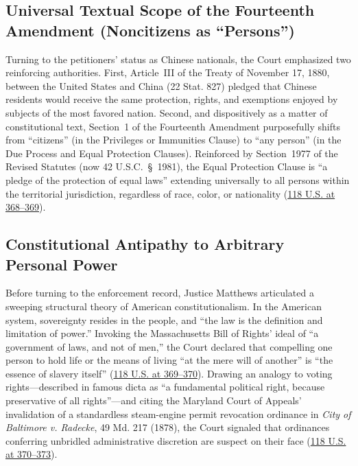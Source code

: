\documentclass[12pt]{article}
\begin{document}
\subsection{Universal Textual Scope of the Fourteenth Amendment (Noncitizens as ``Persons'')}
Turning to the petitioners' status as Chinese nationals, the Court emphasized two reinforcing authorities. First, Article~III of the Treaty of November 17, 1880, between the United States and China (22 Stat. 827) pledged that Chinese residents would receive the same protection, rights, and exemptions enjoyed by subjects of the most favored nation. Second, and dispositively as a matter of constitutional text, Section~1 of the Fourteenth Amendment purposefully shifts from ``citizens'' (in the Privileges or Immunities Clause) to ``any person'' (in the Due Process and Equal Protection Clauses). Reinforced by Section~1977 of the Revised Statutes (now 42 U.S.C.~\S~1981), the Equal Protection Clause is ``a pledge of the protection of equal laws'' extending universally to all persons within the territorial jurisdiction, regardless of race, color, or nationality (\href{https://supreme.justia.com/cases/federal/us/118/356/}{118 U.S. at 368--369}).

\subsection{Constitutional Antipathy to Arbitrary Personal Power}
Before turning to the enforcement record, Justice Matthews articulated a sweeping structural theory of American constitutionalism. In the American system, sovereignty resides in the people, and ``the law is the definition and limitation of power.'' Invoking the Massachusetts Bill of Rights' ideal of ``a government of laws, and not of men,'' the Court declared that compelling one person to hold life or the means of living ``at the mere will of another'' is ``the essence of slavery itself'' (\href{https://supreme.justia.com/cases/federal/us/118/356/}{118 U.S. at 369--370}). Drawing an analogy to voting rights---described in famous dicta as ``a fundamental political right, because preservative of all rights''---and citing the Maryland Court of Appeals' invalidation of a standardless steam-engine permit revocation ordinance in \emph{City of Baltimore v. Radecke}, 49 Md. 217 (1878), the Court signaled that ordinances conferring unbridled administrative discretion are suspect on their face (\href{https://supreme.justia.com/cases/federal/us/118/356/}{118 U.S. at 370--373}).
\end{document}
